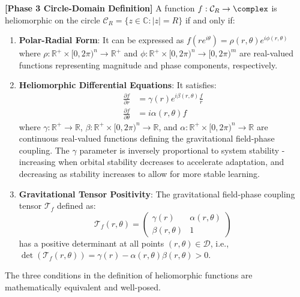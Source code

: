 \begin{definition}
\textbf{[Phase 3 Circle-Domain Definition]} A function $f: \mathcal{C}_R \rightarrow \complex$ is heliomorphic on the circle $\mathcal{C}_R = \{z \in \mathbb{C} : |z| = R\}$ if and only if:
\begin{enumerate}
    \item \textbf{Polar-Radial Form}: It can be expressed as $f(re^{i\theta}) = \rho(r,\theta)e^{i\phi(r,\theta)}$ where $\rho: \mathbb{R}^+ \times [0,2\pi)^n \rightarrow \mathbb{R}^+$ and $\phi: \mathbb{R}^+ \times [0,2\pi)^n \rightarrow [0,2\pi)^m$ are real-valued functions representing magnitude and phase components, respectively.
    
    \item \textbf{Heliomorphic Differential Equations}: It satisfies:
    \begin{align}
        \frac{\partial f}{\partial r} &= \gamma(r)e^{i\beta(r,\theta)}\frac{f}{r}\\
        \frac{\partial f}{\partial \theta} &= i\alpha(r,\theta)f
    \end{align}
    where $\gamma: \mathbb{R}^+ \rightarrow \mathbb{R}$, $\beta: \mathbb{R}^+ \times [0,2\pi)^n \rightarrow \mathbb{R}$, and $\alpha: \mathbb{R}^+ \times [0,2\pi)^n \rightarrow \mathbb{R}$ are continuous real-valued functions defining the gravitational field-phase coupling. The $\gamma$ parameter is inversely proportional to system stability - increasing when orbital stability decreases to accelerate adaptation, and decreasing as stability increases to allow for more stable learning.
    
    \item \textbf{Gravitational Tensor Positivity}: The gravitational field-phase coupling tensor $\mathcal{T}_f$ defined as:
    \begin{equation}
        \mathcal{T}_f(r,\theta) = \begin{pmatrix}
            \gamma(r) & \alpha(r,\theta)\\
            \beta(r,\theta) & 1
        \end{pmatrix}
    \end{equation}
    has a positive determinant at all points $(r,\theta) \in \mathcal{D}$, i.e., $\det(\mathcal{T}_f(r,\theta)) = \gamma(r) - \alpha(r,\theta)\beta(r,\theta) > 0$.
\end{enumerate}
\end{definition}

\begin{theorem}
\label{thm:heliomorphic_equivalence}
The three conditions in the definition of heliomorphic functions are mathematically equivalent and well-posed.
\end{theorem}

